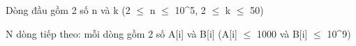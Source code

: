 Dòng đầu gồm 2 số n và k (2 $\le$  n  $\le$  10^5, 2  $\le$  k  $\le$  50)   



    N dòng tiếp theo: mỗi dòng gồm 2 số A[i] và B[i] (A[i]  $\le$  1000 và B[i]  $\le$  10^9)   

\